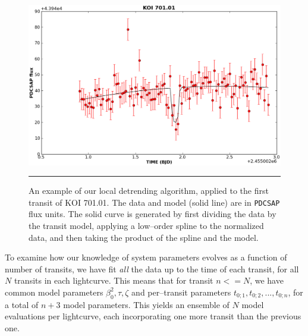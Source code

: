 \begin{figure}[t] 
  \begin{minipage}[c]{0.6\textwidth}
    \includegraphics[width=\textwidth]{figures/701.01.eps}
  \end{minipage}\hfill
  \begin{minipage}[c]{0.4\textwidth}
    \caption{An example of our local detrending algorithm, applied to
      the first transit of KOI 701.01.  The data and model (solid
      line) are in {\tt PDCSAP} flux units.  The solid curve is
      generated by first dividing the data by the transit model,
      applying a low--order spline to the normalized data, and then
      taking the product of the spline and the model.}
    \label{fig-koi70101}
    \hspace*{\fill}  
    \hrule
  \end{minipage}
\end{figure}

\medskip
{\centerline{}}
\smallskip

To examine how our knowledge of system parameters evolves as a
function of number of transits, we have fit {\it all} the data up to
the time of each transit, for all $N$ transits in each lightcurve.
This means that for transit $n <= N$, we have common model parameters
$\beta_{0}^2, \tau, \zeta$ and per--transit parameters $t_{0;1},
t_{0;2}, ..., t_{0;n}$, for a total of $n+3$ model parameters.  This
yields an ensemble of $N$ model evaluations per lightcurve, each
incorporating one more transit than the previous one.

